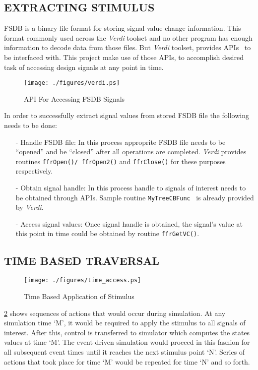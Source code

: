 \subsection{EXTRACTING STIMULUS}
FSDB is a binary file format for storing signal value change information. This format commonly used across the {\it Verdi} toolset and no other program has enough information to decode data from those files. But {\it Verdi} toolset, provides APIs~\citep{Verdi:FsdbReader}  to be interfaced with. This project make use of those APIs, to accomplish desired task of accessing design signals at any point in time.

\begin{figure}[h]
\centering
\texttt{[image: ./figures/verdi.ps]}
\caption{API For Accessing FSDB Signals}
\label{fig:verdi.eps}
\end{figure}

In order to successfully extract signal values from stored FSDB file the following needs to be done:
\begin{enumerate}
	\item[-]Handle FSDB file: In this process approprite FSDB file needs to be ``opened'' and be ``closed'' after all operations are completed. {\it Verdi} provides routines \texttt{ffrOpen()/ ffrOpen2()} and \texttt{ffrClose()} for these purposes respectively.
	\item[-]Obtain signal handle: In this process handle to signals of interest needs to be obtained through APIs. Sample routine \texttt{MyTreeCBFunc}~\citep{Verdi:FsdbReader} is already provided by {\it Verdi}.
	\item[-]Access signal values: Once signal handle is obtained, the signal's value at this point in time could be obtained by routine \texttt{ffrGetVC()}.
\end{enumerate}

\subsection{TIME BASED TRAVERSAL}
\begin{figure}[h]
\centering
\texttt{[image: ./figures/time\_access.ps]}
\caption{Time Based Application of Stimulus}
\label{fig:dualsim:tbas}
\end{figure}

\figurename {\ref{fig:dualsim:tbas}} shows sequences of actions that would occur during simulation. At any simulation time `M', it would be required to apply the stimulus to all signals of interest. After  this, control is transferred to simulator which computes  the states values at time `M'. The event driven simulation  would proceed in this fashion for all subsequent event times until it reaches the next stimulus point `N'. Series of actions that took place for time `M' would be repeated for time `N'  and so forth.

